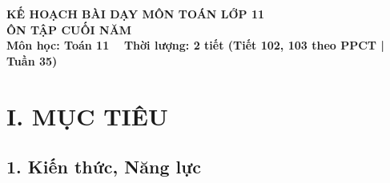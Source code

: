 \documentclass[12pt, a4paper]{article}
\begin{document}
\begin{center}
    {\fontsize{14pt}{17pt}\selectfont \textbf{KẾ HOẠCH BÀI DẠY MÔN TOÁN LỚP 11}}\\[6pt]
    {\fontsize{16pt}{19pt}\selectfont \textbf{ÔN TẬP CUỐI NĂM}}\\[4pt]
    {\fontsize{12pt}{15pt}\selectfont \textbf{Môn học: Toán 11} \ \textbar \ \textbf{Thời lượng: 2 tiết (Tiết 102, 103 theo PPCT | Tuần 35)}}
\end{center}

\vspace{5pt}

\section*{I. MỤC TIÊU}

\subsection*{1. Kiến thức, Năng lực}
\end{document}
